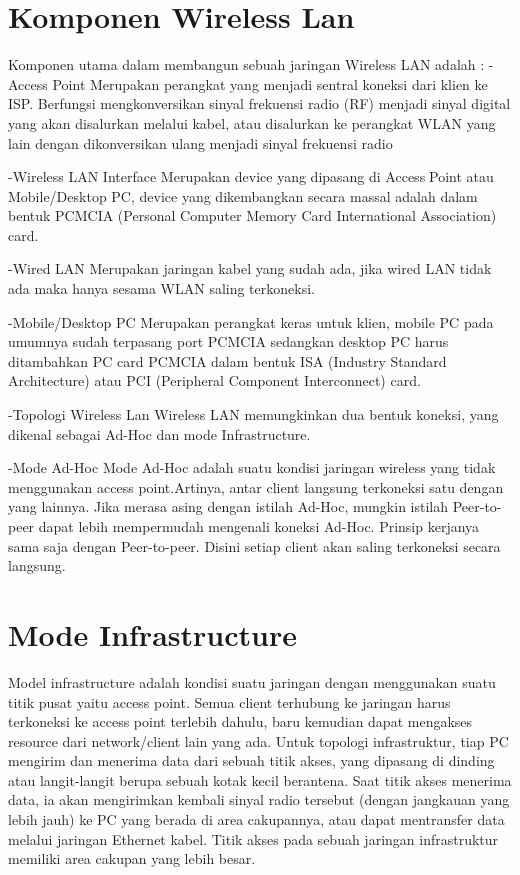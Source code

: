 \documentclass[conference]{IEEEtran}
\begin{document}
\section{Komponen Wireless Lan}
Komponen utama dalam membangun
sebuah jaringan Wireless LAN adalah : 
-Access Point 
Merupakan perangkat yang menjadi sentral koneksi dari klien ke ISP. Berfungsi mengkonversikan sinyal frekuensi radio (RF) menjadi sinyal digital yang akan disalurkan melalui kabel, atau disalurkan ke perangkat WLAN yang lain dengan dikonversikan ulang menjadi sinyal frekuensi radio

-Wireless LAN Interface
Merupakan device yang dipasang di AccessPoint atau Mobile/Desktop PC, device yang dikembangkan secara massal adalah dalam bentuk PCMCIA (Personal Computer Memory Card International Association) card.

-Wired LAN
Merupakan jaringan kabel yang sudah ada, jika wired LAN tidak ada maka hanya sesama WLAN saling terkoneksi.

-Mobile/Desktop PC
Merupakan perangkat keras untuk klien, mobile PC pada umumnya sudah terpasang port PCMCIA sedangkan desktop PC harus ditambahkan PC card PCMCIA dalam bentuk ISA (Industry Standard Architecture) atau PCI
(Peripheral Component Interconnect) card.

-Topologi Wireless Lan
Wireless LAN memungkinkan dua bentuk koneksi, yang dikenal sebagai Ad-Hoc dan mode Infrastructure.

-Mode Ad-Hoc
Mode Ad-Hoc adalah suatu kondisi jaringan wireless yang tidak menggunakan access point.Artinya, antar client langsung terkoneksi satu dengan yang lainnya. Jika merasa asing dengan istilah Ad-Hoc, mungkin istilah Peer-to-peer dapat lebih mempermudah mengenali koneksi Ad-Hoc. Prinsip kerjanya sama saja dengan
Peer-to-peer. Disini setiap client akan saling terkoneksi secara langsung.


\section{Mode Infrastructure}
Model infrastructure adalah kondisi suatu jaringan dengan menggunakan suatu titik pusat yaitu access point. Semua client terhubung ke jaringan harus terkoneksi ke access point terlebih dahulu, baru kemudian dapat mengakses resource dari network/client lain yang ada. Untuk topologi infrastruktur, tiap PC mengirim dan menerima data dari sebuah titik akses, yang dipasang di dinding atau langit-langit berupa
sebuah kotak kecil berantena. Saat titik akses menerima data, ia akan mengirimkan kembali
sinyal radio tersebut (dengan jangkauan yang lebih jauh) ke PC yang berada di area cakupannya, atau dapat mentransfer data melalui jaringan Ethernet kabel. Titik akses pada sebuah jaringan infrastruktur memiliki area cakupan yang lebih besar.
\end{document}
